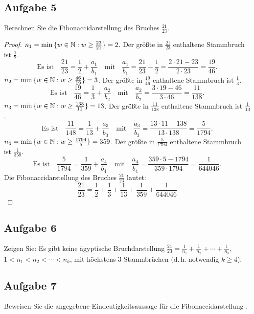 \subsection{Aufgabe 5}
Berechnen Sie die Fibonaccidarstellung des Bruches $\frac{21}{23}$.
\begin{proof}
  $n_1 = \min{\{ w \in \mathbb{N}: w \geq \frac{23}{21} \}} = 2$.
  Der größte in $\frac{21}{23}$ enthaltene Stammbruch ist $\frac{1}{2}$.
  \begin{equation*}
    \text{Es ist} \quad \frac{21}{23} = \frac{1}{2} + \frac{a_1}{b_1} \quad \text{mit}
    \quad \frac{a_1}{b_1} = \frac{21}{23} - \frac{1}{2} =
    \frac{2 \cdot 21 - 23}{2 \cdot 23} = \frac{19}{46}.
  \end{equation*}
  $n_2 = \min{\{ w \in \mathbb{N}: w \geq \frac{46}{19} \}} = 3$.
  Der größte in $\frac{19}{46}$ enthaltene Stammbruch ist $\frac{1}{3}$.
  \begin{equation*}
    \text{Es ist} \quad \frac{19}{46} = \frac{1}{3} + \frac{a_2}{b_2} \quad \text{mit}
    \quad \frac{a_2}{b_2} =
    \frac{3 \cdot 19 - 46}{3 \cdot 46} = \frac{11}{138}.
  \end{equation*}
  $n_3 = \min{\{ w \in \mathbb{N}: w \geq \frac{138}{11} \}} = 13$.
  Der größte in $\frac{11}{138}$ enthaltene Stammbruch ist $\frac{1}{13}$.
  \begin{equation*}
    \text{Es ist} \quad \frac{11}{148} = \frac{1}{13} + \frac{a_3}{b_3} \quad \text{mit}
    \quad \frac{a_3}{b_3} =
    \frac{13 \cdot 11 - 138}{13 \cdot 138} = \frac{5}{1794}.
  \end{equation*}
  $n_4 = \min{\{ w \in \mathbb{N}: w \geq \frac{1794}{5} \}} = 359$.
  Der größte in $\frac{5}{1794}$ enthaltene Stammbruch ist $\frac{1}{359}$.
  \begin{equation*}
    \text{Es ist} \quad \frac{5}{1794} = \frac{1}{359} + \frac{a_4}{b_4} \quad \text{mit}
    \quad \frac{a_4}{b_4} =
    \frac{359 \cdot 5 - 1794}{359 \cdot 1794} = \frac{1}{644046}.
  \end{equation*}
  Die Fibonaccidarstellung des Bruches $\frac{21}{23}$ lautet:
  \begin{equation*}
    \frac{21}{23} = \frac{1}{2} + \frac{1}{3} +
    \frac{1}{13} + \frac{1}{359} + \frac{1}{644046}
  \end{equation*}
\end{proof}

\subsection{Aufgabe 6}
Zeigen Sie: Es gibt keine ägyptische Bruchdarstellung
$\frac{21}{23} = \frac{1}{n_1} + \frac{1}{n_2} + \dotsb + \frac{1}{n_k}$,
$1 < n_1 < n_2 < \dotsb < n_k$, mit höchstens 3 Stammbrüchen
(d.\,h. notwendig $k \geq 4$).

\subsection{Aufgabe 7}
Beweisen Sie die angegebene Eindeutigkeitsaussage für die Fibonaccidarstellung
\parencite[53]{book:zahlentheorie}.
